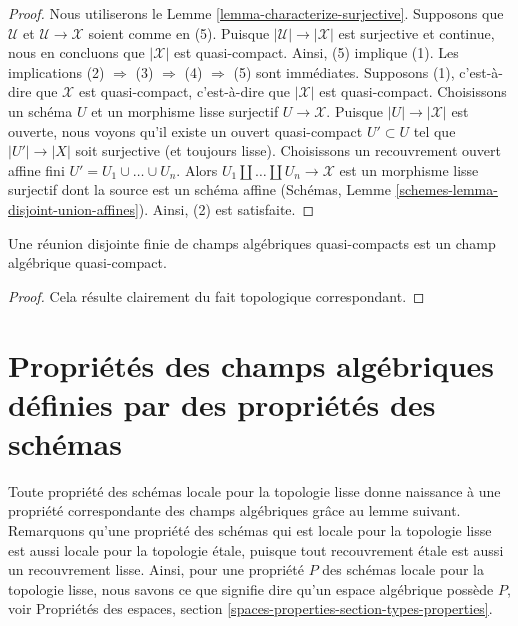 \begin{proof}
Nous utiliserons le
Lemme \ref{lemma-characterize-surjective}.
Supposons que $\mathcal{U}$ et $\mathcal{U} \to \mathcal{X}$ soient comme en (5).
Puisque $|\mathcal{U}| \to |\mathcal{X}|$ est surjective et
continue, nous en concluons que $|\mathcal{X}|$ est quasi-compact.
Ainsi, (5) implique (1). Les implications
(2) $\Rightarrow$ (3) $\Rightarrow$ (4) $\Rightarrow$ (5)
sont immédiates. Supposons (1), c'est-à-dire que $\mathcal{X}$ est quasi-compact, c'est-à-dire que
$|\mathcal{X}|$ est quasi-compact. Choisissons un schéma $U$ et un morphisme lisse
surjectif $U \to \mathcal{X}$. Puisque $|U| \to |\mathcal{X}|$
est ouverte, nous voyons qu'il existe un ouvert quasi-compact $U' \subset U$
tel que $|U'| \to |X|$ soit surjective (et toujours lisse).
Choisissons un recouvrement ouvert affine fini $U' = U_1 \cup \ldots \cup U_n$.
Alors $U_1 \amalg \ldots \amalg U_n \to \mathcal{X}$
est un morphisme lisse surjectif dont la source est un
schéma affine (Schémas, Lemme \ref{schemes-lemma-disjoint-union-affines}).
Ainsi, (2) est satisfaite.
\end{proof}

\begin{lemma}
\label{lemma-finite-disjoint-quasi-compact}
Une réunion disjointe finie de champs algébriques quasi-compacts est
un champ algébrique quasi-compact.
\end{lemma}

\begin{proof}
Cela résulte clairement du fait topologique correspondant.
\end{proof}


\section{Propriétés des champs algébriques définies par des propriétés des schémas}
\label{section-types-properties}

\noindent
Toute propriété des schémas locale pour la topologie lisse donne naissance à une
propriété correspondante des champs algébriques grâce au lemme suivant. Remarquons qu'une
propriété des schémas qui est locale pour la topologie lisse est aussi locale pour la topologie \'etale,
puisque tout recouvrement \'etale est aussi un recouvrement lisse. Ainsi, pour une propriété $P$
des schémas locale pour la topologie lisse, nous savons ce que signifie dire qu'un
espace algébrique possède $P$, voir
Propriétés des espaces, section \ref{spaces-properties-section-types-properties}.

